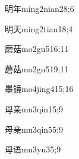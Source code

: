\begin{verbete}{明年}{ming2nian2}{8;6}
\end{verbete}
\begin{verbete}{明天}{ming2tian1}{8;4}
\end{verbete}
\begin{verbete}{磨菇}{mo2gu5}{16;11}
\end{verbete}
\begin{verbete}{蘑菇}{mo2gu5}{19;11}
\end{verbete}
\begin{verbete}{墨镜}{mo4jing4}{15;16}
\end{verbete}
\begin{verbete}{母亲}{mu3qin1}{5;9}
\end{verbete}
\begin{verbete}{母亲}{mu3qin5}{5;9}
\end{verbete}
\begin{verbete}{母语}{mu3yu3}{5;9}
\end{verbete}

